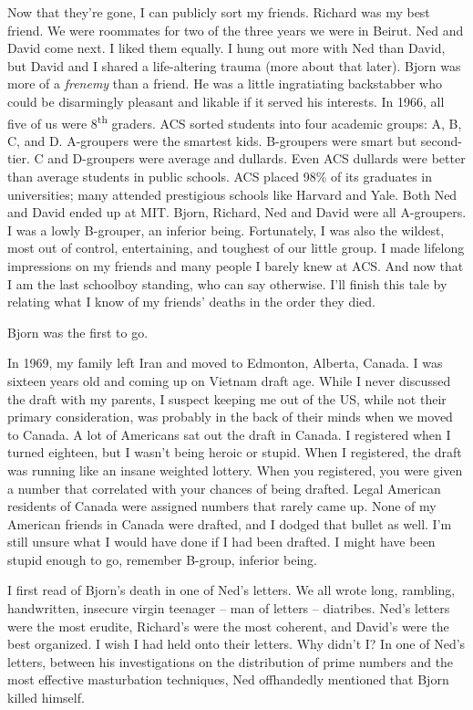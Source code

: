 Now that they're gone, I can publicly sort my friends. Richard was my
best friend. We were roommates for two of the three years we were in
Beirut. Ned and David come next. I liked them equally. I hung out more
with Ned than David, but David and I shared a life-altering trauma (more
about that later). Bjorn was more of a \emph{frenemy} than a friend. He
was a little ingratiating backstabber who could be disarmingly pleasant
and likable if it served his interests. In 1966, all five of us were
8\textsuperscript{th} graders. ACS sorted students into four academic
groups: A, B, C, and D. A-groupers were the smartest kids. B-groupers
were smart but second-tier. C and D-groupers were average and dullards.
Even ACS dullards were better than average students in public schools.
ACS placed 98\% of its graduates in universities; many attended
prestigious schools like Harvard and Yale. Both Ned and David ended up
at MIT. Bjorn, Richard, Ned and David were all A-groupers. I was a lowly
B-grouper, an inferior being. Fortunately, I was also the wildest, most
out of control, entertaining, and toughest of our little group. I made
lifelong impressions on my friends and many people I barely knew at ACS.
And now that I am the last schoolboy standing, who can say otherwise.
I'll finish this tale by relating what I know of my friends' deaths in
the order they died.

Bjorn was the first to go.

In 1969, my family left Iran and moved to Edmonton, Alberta, Canada. I
was sixteen years old and coming up on Vietnam draft age. While I never
discussed the draft with my parents, I suspect keeping me out of the US,
while not their primary consideration, was probably in the back of their
minds when we moved to Canada. A lot of Americans sat out the draft in
Canada. I registered when I turned eighteen, but I wasn't being heroic
or stupid. When I registered, the draft was running like an insane
weighted lottery. When you registered, you were given a number that
correlated with your chances of being drafted. Legal American residents
of Canada were assigned numbers that rarely came up. None of my American
friends in Canada were drafted, and I dodged that bullet as well. I'm
still unsure what I would have done if I had been drafted. I might have
been stupid enough to go, remember B-group, inferior being.

I first read of Bjorn's death in one of Ned's letters. We all wrote
long, rambling, handwritten, insecure virgin teenager -- man of letters
-- diatribes. Ned's letters were the most erudite, Richard's were the
most coherent, and David's were the best organized. I wish I had held
onto their letters. Why didn't I? In one of Ned's letters, between his
investigations on the distribution of prime numbers and the most
effective masturbation techniques, Ned offhandedly mentioned that Bjorn
killed himself.

